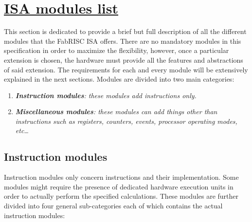 \section[ISA modules list]{\LARGE\underline{ISA modules list}}

    \vspace{10pt}

    This section is dedicated to provide a brief but full description of all the different modules that the FabRISC ISA offers. There are no mandatory modules in this specification in order to maximize the flexibility, however, once a particular extension is chosen, the hardware must provide all the features and abstractions of said extension. The requirements for each and every module will be extensively explained in the next sections. Modules are divided into two main categories:

    \begin{enumerate}

        \item \textit{\textbf{Instruction modules}: these modules add instructions only.}

        \item \textit{\textbf{Miscellaneous modules}: these modules can add things other than instructions such as registers, counters, events, processor operating modes, etc\ldots}

    \end{enumerate}

    \subsection{Instruction modules}

        Instruction modules only concern instructions and their implementation. Some modules might require the presence of dedicated hardware execution units in order to actually perform the specified calculations. These modules are further divided into four general sub-categories each of which contains the actual instruction modules:

